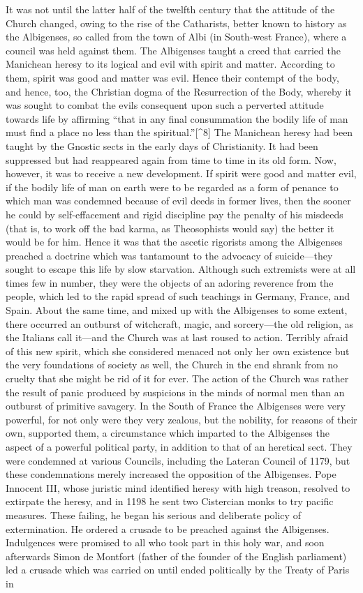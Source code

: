 \documentclass{book}
\begin{document}
It was not until the latter half of the twelfth century that the attitude of the Church changed, owing to the rise of the Catharists, better known to history as the Albigenses, so called from the town of Albi (in South-west France), where a council was held against them. The Albigenses taught a creed that carried the Manichean heresy to its logical and evil with spirit and matter. According to them, spirit was good and matter was evil. Hence their contempt of the body, and hence, too, the Christian dogma of the Resurrection of the Body, whereby it was sought to combat the evils consequent upon such a perverted attitude towards life by affirming “that in any final consummation the bodily life of man must find a place no less than the spiritual.”{[}\textasciicircum{}8{]} The Manichean heresy had been taught by the Gnostic sects in the early days of Christianity. It had been suppressed but had reappeared again from time to time in its old form. Now, however, it was to receive a new development. If spirit were good and matter evil, if the bodily life of man on earth were to be regarded as a form of penance to which man was condemned because of evil deeds in former lives, then the sooner he could by self-effacement and rigid discipline pay the penalty of his misdeeds (that is, to work off the bad karma, as Theosophists would say) the better it would be for him. Hence it was that the ascetic rigorists among the Albigenses preached a doctrine which was tantamount to the advocacy of suicide—they sought to escape this life by slow starvation. Although such extremists were at all times few in number, they were the objects of an adoring reverence from the people, which led to the rapid spread of such teachings in Germany, France, and Spain. About the same time, and mixed up with the Albigenses to some extent, there occurred an outburst of witchcraft, magic, and sorcery—the old religion, as the Italians call it—and the Church was at last roused to action. Terribly afraid of this new spirit, which she considered menaced not only her own existence but the very foundations of society as well, the Church in the end shrank from no cruelty that she might be rid of it for ever. The action of the Church was rather the result of panic produced by suspicions in the minds of normal men than an outburst of primitive savagery. In the South of France the Albigenses were very powerful, for not only were they very zealous, but the nobility, for reasons of their own, supported them, a circumstance which imparted to the Albigenses the aspect of a powerful political party, in addition to that of an heretical sect. They were condemned at various Councils, including the Lateran Council of 1179, but these condemnations merely increased the opposition of the Albigenses. Pope Innocent III, whose juristic mind identified heresy with high treason, resolved to extirpate the heresy, and in 1198 he sent two Cistercian monks to try pacific measures. These failing, he began his serious and deliberate policy of extermination. He ordered a crusade to be preached against the Albigenses. Indulgences were promised to all who took part in this holy war, and soon afterwards Simon de Montfort (father of the founder of the English parliament) led a crusade which was carried on until ended politically by the Treaty of Paris in 
\end{document}
